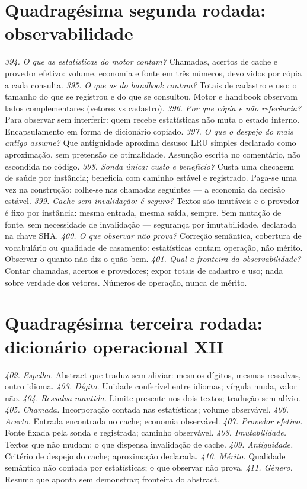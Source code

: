 \section{Quadragésima segunda rodada: observabilidade}
\textit{394. O que as estatísticas do motor contam?} Chamadas, acertos de cache e provedor efetivo: volume, economia e fonte em três números, devolvidos por cópia a cada consulta.
\textit{395. O que as do handbook contam?} Totais de cadastro e uso: o tamanho do que se registrou e do que se consultou. Motor e handbook observam lados complementares (vetores vs cadastro).
\textit{396. Por que cópia e não referência?} Para observar sem interferir: quem recebe estatísticas não muta o estado interno. Encapsulamento em forma de dicionário copiado.
\textit{397. O que o despejo do mais antigo assume?} Que antiguidade aproxima desuso: LRU simples declarado como aproximação, sem pretensão de otimalidade. Assunção escrita no comentário, não escondida no código.
\textit{398. Sonda única: custo e benefício?} Custa uma checagem de saúde por instância; beneficia com caminho estável e registrado. Paga-se uma vez na construção; colhe-se nas chamadas seguintes --- a economia da decisão estável.
\textit{399. Cache sem invalidação: é seguro?} Textos são imutáveis e o provedor é fixo por instância: mesma entrada, mesma saída, sempre. Sem mutação de fonte, sem necessidade de invalidação --- segurança por imutabilidade, declarada na chave SHA.
\textit{400. O que observar não prova?} Correção semântica, cobertura de vocabulário ou qualidade de casamento: estatísticas contam operação, não mérito. Observar o quanto não diz o quão bem.
\textit{401. Qual a fronteira da observabilidade?} Contar chamadas, acertos e provedores; expor totais de cadastro e uso; nada sobre verdade dos vetores. Números de operação, nunca de mérito.
\section{Quadragésima terceira rodada: dicionário operacional XII}
\textit{402. Espelho.} Abstract que traduz sem aliviar: mesmos dígitos, mesmas ressalvas, outro idioma.
\textit{403. Dígito.} Unidade conferível entre idiomas; vírgula muda, valor não.
\textit{404. Ressalva mantida.} Limite presente nos dois textos; tradução sem alívio.
\textit{405. Chamada.} Incorporação contada nas estatísticas; volume observável.
\textit{406. Acerto.} Entrada encontrada no cache; economia observável.
\textit{407. Provedor efetivo.} Fonte fixada pela sonda e registrada; caminho observável.
\textit{408. Imutabilidade.} Textos que não mudam; o que dispensa invalidação de cache.
\textit{409. Antiguidade.} Critério de despejo do cache; aproximação declarada.
\textit{410. Mérito.} Qualidade semântica não contada por estatísticas; o que observar não prova.
\textit{411. Gênero.} Resumo que aponta sem demonstrar; fronteira do abstract.
